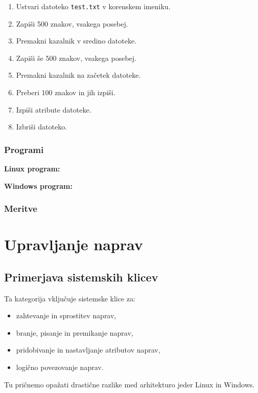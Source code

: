 \documentclass[a4paper,12pt,openright]{book}
\begin{document}
\begin{enumerate}
	\item Ustvari datoteko \texttt{test.txt} v korenskem imeniku.
	\item Zapiši 500 znakov, vsakega posebej.
	\item Premakni kazalnik v sredino datoteke.
	\item Zapiši še 500 znakov, vsakega posebej.
	\item Premakni kazalnik na začetek datoteke.
	\item Preberi 100 znakov in jih izpiši.
	\item Izpiši atribute datoteke.
	\item Izbriši datoteko.
\end{enumerate}

\subsection{Programi}

\textbf{Linux program:}


\textbf{Windows program:}


\subsection{Meritve}

\chapter{Upravljanje naprav}

\section{Primerjava sistemskih klicev}

Ta kategorija vključuje sistemske klice za:
\begin{itemize}
	\item zahtevanje in sprostitev naprav,
	\item branje, pisanje in premikanje naprav,
	\item pridobivanje in nastavljanje atributov naprav,
	\item logično povezovanje naprav. \cite{Silberschatz_Galvin_Gagne_2018}
\end{itemize}

Tu pričnemo opažati drastične razlike med arhitekturo jeder Linux in Windows.
\end{document}
